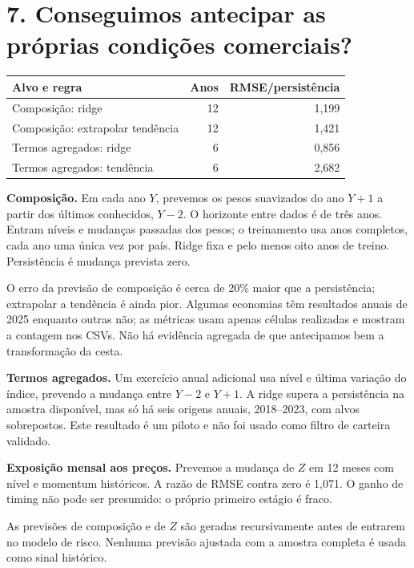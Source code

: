 \documentclass[11pt,a4paper]{article}
\begin{document}
\section*{7. Conseguimos antecipar as próprias condições comerciais?}
\small\begin{center}\begin{tabular}{lrr}\toprule Alvo e regra & Anos & RMSE/persistência\\\midrule 
Composição: ridge & 12 & 1,199\\
Composição: extrapolar tendência & 12 & 1,421\\
Termos agregados: ridge & 6 & 0,856\\
Termos agregados: tendência & 6 & 2,682\\\bottomrule\end{tabular}\end{center}\normalsize

\textbf{Composição.} Em cada ano $Y$, prevemos os pesos suavizados do ano $Y+1$ a partir dos últimos conhecidos, $Y-2$. O horizonte entre dados é de três anos. Entram níveis e mudanças passadas dos pesos; o treinamento usa anos completos, cada ano uma única vez por país. Ridge fixa e pelo menos oito anos de treino. Persistência é mudança prevista zero.

O erro da previsão de composição é cerca de 20\% maior que a persistência; extrapolar a tendência é ainda pior. Algumas economias têm resultados anuais de 2025 enquanto outras não; as métricas usam apenas células realizadas e mostram a contagem nos CSVs. Não há evidência agregada de que antecipamos bem a transformação da cesta.

\textbf{Termos agregados.} Um exercício anual adicional usa nível e última variação do índice, prevendo a mudança entre $Y-2$ e $Y+1$. A ridge supera a persistência na amostra disponível, mas só há seis origens anuais, 2018--2023, com alvos sobrepostos. Este resultado é um piloto e não foi usado como filtro de carteira validado.

\textbf{Exposição mensal aos preços.} Prevemos a mudança de $Z$ em 12 meses com nível e momentum históricos. A razão de RMSE contra zero é 1,071. O ganho de timing não pode ser presumido: o próprio primeiro estágio é fraco.

As previsões de composição e de $Z$ são geradas recursivamente antes de entrarem no modelo de risco. Nenhuma previsão ajustada com a amostra completa é usada como sinal histórico.

\clearpage
\end{document}
